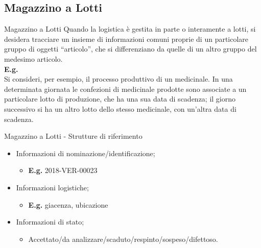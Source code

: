 \documentclass{beamer}
\begin{document}
\subsection{Magazzino a Lotti}
\begin{frame}{Magazzino a Lotti}
    Quando la logistica è gestita in parte o interamente a lotti, si desidera tracciare un insieme di informazioni comuni proprie di un particolare gruppo di oggetti “articolo”, che si differenziano da quelle di un altro gruppo del medesimo articolo.\\
    \vspace{1.5em}
    \textbf{E.g.}\\
    Si consideri, per esempio, il processo produttivo di un medicinale. In una determinata giornata le confezioni di medicinale prodotte sono associate a un particolare lotto di produzione, che ha una sua data di scadenza; il giorno successivo si ha un altro lotto dello stesso medicinale, con un'altra data di scadenza.
\end{frame}

\begin{frame}{Magazzino a Lotti - Strutture di riferimento}
    \begin{itemize}
        \item Informazioni di nominazione/identificazione;
        \begin{itemize}
            \item \textbf{E.g.} 2018-VER-00023
        \end{itemize}
        \item Informazioni logistiche;
        \begin{itemize}
            \item \textbf{E.g.} giacenza, ubicazione
        \end{itemize}
        \item Informazioni di stato;
        \begin{itemize}
            \item Accettato/da analizzare/scaduto/respinto/sospeso/difettoso.
        \end{itemize}
    \end{itemize}
\end{frame}
\end{document}

